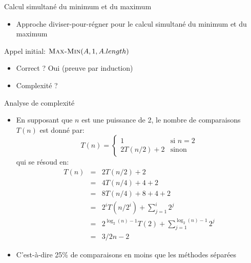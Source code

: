 \begin{frame}{Calcul simultané du minimum et du maximum}

\begin{itemize}
\item Approche diviser-pour-régner pour le calcul simultané du minimum et du maximum
\end{itemize}

\begin{center}
{\small
{}
}
\end{center}

\centerline{Appel initial: $\textnormal{\scshape Max-Min}(A,1,A.length)$}

\bigskip

\begin{itemize}
\item Correct ? Oui (preuve par induction)
\item Complexité ?
\end{itemize}

\end{frame}

\begin{frame}{Analyse de complexité}

\begin{itemize}
\item En supposant que $n$ est une puissance de 2, le nombre de
  comparaisons $T(n)$ est donné par: {\small
\[
T(n) = \left\{
\begin{array}{ll}
 1 & \mbox{si }n=2\\
2 T(n/2)+2 & \mbox{sinon}
\end{array}
\right.
\]}
qui se résoud en:
{\footnotesize
\begin{eqnarray*}
T(n) & = & 2 T(n/2)+2\\
& = & 4 T(n/4)+4+2\\
& = & 8 T(n/4)+8+4+2\\
& = & 2^i T(n/2^i)+\sum_{j=1}^i 2^j\\
& = & 2^{\log_2(n)-1} T(2)+\sum_{j=1}^{\log_2(n)-1} 2^j\\
& = & 3/2 n -2
\end{eqnarray*}}
\item C'est-à-dire 25\% de comparaisons en moins que les méthodes séparées
\end{itemize}

\end{frame}

